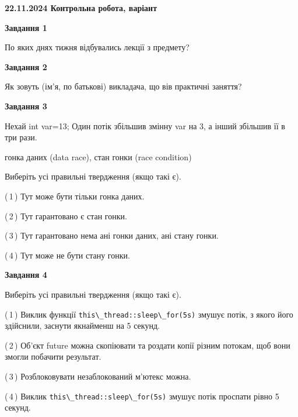\documentclass[12pt, ukrainian]{article}
\def\code#1{\Verb!#1!}
\begin{document}
\begin {large}

\textbf{22.11.2024 Контрольна робота, варіант  }\par


{

\begin{center}
\textbf{Завдання 1}
\end{center}

По яких днях тижня відбувались лекції з предмету?


\begin{center}
\textbf{Завдання 2}
\end{center}

Як зовуть (ім'я, по батькові) викладача, що вів практичні заняття?


\begin{center}
\textbf{Завдання 3}
\end{center}

Нехай int var=13; Один потік збільшив змінну var на 3, а інший збільшив її в три рази.

гонка даних (data race), стан гонки (race condition)

Виберіть усі правильні твердження (якщо такі є).\par
\vspace{2mm}
(\,1\,) Тут може бути тільки гонка даних.%

(\,2\,) Тут гарантовано є стан гонки.%

(\,3\,) Тут гарантовано нема ані гонки даних, ані стану гонки.%

(\,4\,) Тут може не бути стану гонки.%


\begin{center}
\textbf{Завдання 4}
\end{center}

Виберіть усі правильні твердження (якщо такі є).\par
\vspace{2mm}

(\,1\,) Виклик функції \code{this\_thread::sleep\_for(5s)} змушує потік, з якого його здійснили, заснути якнайменш на 5 секунд.%

(\,2\,) Об’єкт future можна скопіювати та роздати копії різним потокам, щоб вони змогли побачити результат.%

(\,3\,) Розблоковувати незаблокований м’ютекс можна.%

(\,4\,) Виклик \code{this\_thread::sleep\_for(5s)} змушує потік проспати рівно 5 секунд.%


}
\end{large}
\end{document}
